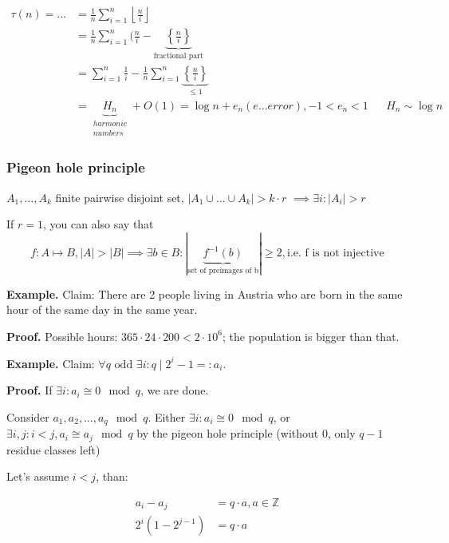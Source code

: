 \begin{align*}
\tau(n) = ... &=
    \frac{1}{n} \sum_{i=1}^n \left\lfloor\frac{n}{i}\right\rfloor \\
    &= \frac{1}{n} \sum_{i=1}^n (\frac{n}{i} -
        \underbrace{\left\{ \frac ni \right\} }_{\text{fractional part}} \\
    &= \sum_{i=1}^n \frac1i -
        \frac1n\sum_{i=1}^n
            \underbrace{\left\{ \frac ni \right\} }_{≤ 1} \\
    &=  \underbrace{H_n}_{\begin{matrix}harmonic \\ numbers\end{matrix}} + O(1) =
        \log n + e_n (e ... error), -1 < e_n < 1 && H_n\sim \log n
\end{align*}


\subsubsection{Pigeon hole principle}

$A_1, \ldots , A_k$ finite pairwise disjoint set,
$|A_1 \cup \ldots \cup A_k| > k\cdot r$
$\implies \exists i : |A_i| > r$

If $r=1$, you can also say that
\[
    f: A\mapsto B, |A| > |B| \implies \exists b \in B :
    |\underbrace{f^{-1}(b)}_{\text{set of preimages of b}}|
        ≥ 2 ,
        \text{i.e. f is not injective}
\]


\textbf{Example.}
Claim: There are 2 people living in Austria who are born in the same hour of the same day in the same year.

\textbf{Proof.}
Possible hours: $365\cdot 24\cdot 200 < 2\cdot 10^6$;
the population is bigger than that.


\textbf{Example.}
Claim: $\forall q\text{ odd } \exists i: q \mid 2^i-1 =: a_i$.

\textbf{Proof.}
If $\exists i: a_i \cong 0 \mod q$, we are done.

Consider $a_1, a_2,\ldots, a_q \mod q$.
Either $\exists i: a_i \cong 0 \mod q$,
or $\exists i,j: i < j, a_i \cong a_j \mod q$
by the pigeon hole principle (without 0, only $q-1$ residue classes left)

Let's assume $i < j$, than:

\begin{align*}
a_i - a_j &= q\cdot a, a\in\mathbb{Z} \\
2^i(1 - 2^{j-1}) &= q\cdot a
\end{align*}

